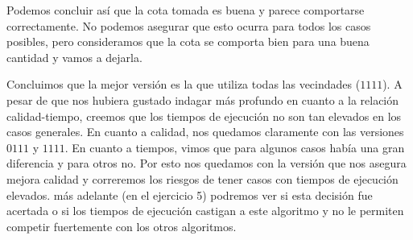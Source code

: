 \par Podemos concluir así que la cota tomada es buena y parece comportarse correctamente. No podemos asegurar que esto ocurra para todos los casos posibles, pero consideramos que la cota se comporta bien para una buena cantidad y vamos a dejarla.



\bigskip

\par Concluimos que la mejor versión es la que utiliza todas las vecindades ($1111$). A pesar de que nos hubiera gustado indagar más profundo en cuanto a la relación calidad-tiempo, creemos que los tiempos de ejecución no son tan elevados en los casos generales. En cuanto a calidad, nos quedamos claramente con las versiones $0111$ y $1111$. En cuanto a tiempos, vimos que para algunos casos había una gran diferencia y para otros no. Por esto nos quedamos con la versión que nos asegura mejora calidad y correremos los riesgos de tener casos con tiempos de ejecución elevados. más adelante (en el ejercicio 5) podremos ver si esta decisión fue acertada o si los tiempos de ejecución castigan a este algoritmo y no le permiten competir fuertemente con los otros algoritmos.